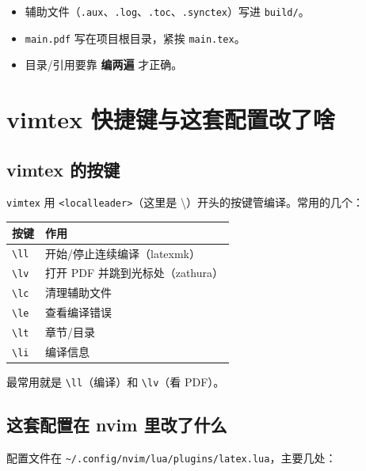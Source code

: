 \begin{itemize}
  \item 辅助文件（\texttt{.aux}、\texttt{.log}、\texttt{.toc}、\texttt{.synctex}）写进 \texttt{build/}。
  \item \texttt{main.pdf} 写在项目根目录，紧挨 \texttt{main.tex}。
  \item 目录/引用要靠 \textbf{编两遍} 才正确。
\end{itemize}

\section{vimtex 快捷键与这套配置改了啥}

\subsection{vimtex 的按键}

\texttt{vimtex} 用 \texttt{<localleader>}（这里是 \textbackslash）开头的按键管编译。常用的几个：

\begin{table}[htbp]
  \centering
  \begin{tabular}{ll}
    \toprule
    按键 & 作用 \\
    \midrule
    \texttt{\textbackslash ll} & 开始/停止连续编译（latexmk）\\
    \texttt{\textbackslash lv} & 打开 PDF 并跳到光标处（zathura）\\
    \texttt{\textbackslash lc} & 清理辅助文件 \\
    \texttt{\textbackslash le} & 查看编译错误 \\
    \texttt{\textbackslash lt} & 章节/目录 \\
    \texttt{\textbackslash li} & 编译信息 \\
    \bottomrule
  \end{tabular}
\end{table}

最常用就是 \texttt{\textbackslash ll}（编译）和 \texttt{\textbackslash lv}（看 PDF）。

\subsection{这套配置在 nvim 里改了什么}

配置文件在 \texttt{\textasciitilde/.config/nvim/lua/plugins/latex.lua}，主要几处：

